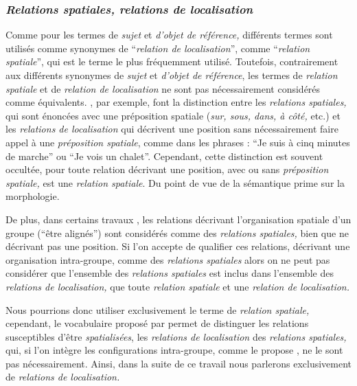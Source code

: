 \subsubsection{\emph{Relations spatiales, relations de localisation}}

Comme pour les termes de \emph{sujet} et \emph{d'objet de référence,}
différents termes sont utilisés comme synonymes de
\enquote{\emph{relation de localisation}}, comme
\enquote{\emph{relation spatiale}}, qui est le terme le plus
fréquemment utilisé. Toutefois, contrairement aux différents synonymes
de \emph{sujet} et \emph{d'objet de référence}, les termes de
\emph{relation spatiale} et de \emph{relation de localisation} ne sont
pas nécessairement considérés comme
équivalents. \textcite{Duchene2019}, par exemple, font la distinction
entre les \emph{relations spatiales,} qui sont énoncées avec une
préposition spatiale (\eg \emph{sur, sous, dans, à côté,} etc.) et les
\emph{relations de localisation} qui décrivent une position sans
nécessairement faire appel à une \emph{préposition spatiale}, comme
dans les phrases : \enquote{Je suis à cinq minutes de marche} ou
\enquote{Je vois un chalet}. Cependant, cette distinction est souvent
occultée, pour \textcite{Vandeloise1986} toute relation décrivant une
position, avec ou sans \emph{préposition spatiale,} est une
\emph{relation spatiale}. Du point de vue de \textcite{Vandeloise1986}
la sémantique prime sur la morphologie.

De plus, dans certains travaux \autocite{Bateman2010}, les relations
décrivant l'organisation spatiale d'un groupe (\eg \enquote{être
  alignés}) sont considérés comme des \emph{relations spatiales,} bien
que ne décrivant pas une position. Si l'on accepte de qualifier ces
relations, décrivant une organisation intra-groupe, comme des
\emph{relations spatiales} alors on ne peut pas considérer que
l'ensemble des \emph{relations spatiales} est inclus dans l'ensemble
des \emph{relations de localisation,} \ie que toute \emph{relation
  spatiale} et une \emph{relation de localisation.}

Nous pourrions donc utiliser exclusivement le terme de \emph{relation
  spatiale,} cependant, le vocabulaire proposé par
\textcite{Duchene2019} permet de distinguer les relations susceptibles
d'être \emph{spatialisées}, \ie les \emph{relations de localisation}
des \emph{relations spatiales,} qui, si l'on intègre les
configurations intra-groupe, comme le propose \textcite{Bateman2010},
ne le sont pas nécessairement. Ainsi, dans la suite de ce travail nous
parlerons exclusivement de \emph{relations de localisation.}

